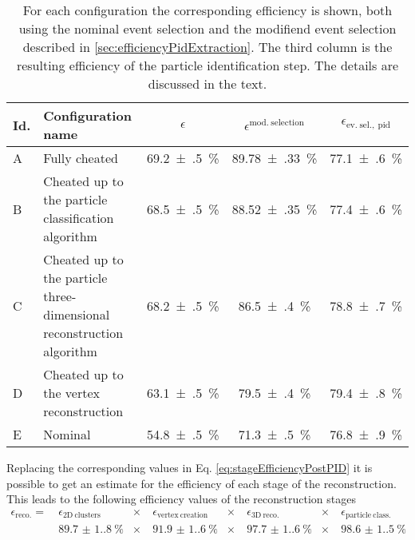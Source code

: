 \begin{table}[]
    \centering
    \caption[Particle identification efficiency for all configurations]{For each configuration the corresponding efficiency is shown, both using the nominal event selection and the modifiend event selection described in \autoref{sec:efficiencyPidExtraction}. The third column is the resulting efficiency of the particle identification step. The details are discussed in the text. }
    \label{tab:pidEfficiencyPerConfiguration}
    \begin{tabular}{lp{4cm}ccc}
        \hline
         Id. & Configuration name & $\epsilon$ & $\epsilon^\mathrm{mod.\ selection}$ & $\epsilon_\mathrm{ev.\ sel.,\ pid}$ \\
         \hline
         A & Fully cheated & \SI{69.2(5)}{\percent} & \SI{89.78(33)}{\percent} & \SI{77.1(6)}{\percent} \\
         B & Cheated up to the particle classification algorithm & \SI{68.5(5)}{\percent} & \SI{88.52(35)}{\percent} & \SI{77.4(6)}{\percent} \\
         C & Cheated up to the particle three-dimensional reconstruction algorithm & \SI{68.2(5)}{\percent} & \SI{86.5(4)}{\percent} & \SI{78.8(7)}{\percent} \\
         D & Cheated up to the vertex reconstruction & \SI{63.1(5)}{\percent} & \SI{79.5(4)}{\percent} & \SI{79.4(8)}{\percent} \\
         E & Nominal & \SI{54.8(5)}{\percent} & \SI{71.3(5)}{\percent} & \SI{76.8(9)}{\percent} \\
         \hline
    \end{tabular}
\end{table}

Replacing the corresponding values in Eq. \eqref{eq:stageEfficiencyPostPID} it is possible to get an estimate for the efficiency of each stage of the reconstruction. This leads to the following efficiency values of the reconstruction stages \begin{equation}
    \begin{aligned}
        \epsilon_\mathrm{reco.} =&\
        \epsilon_\mathrm{2D\ clusters} &\times&\ 
        \epsilon_\mathrm{vertex\ creation} &\times&\ 
        \epsilon_\mathrm{3D\ reco.} &\times&\ 
        \epsilon_\mathrm{particle\ class.} \\  
        &\ \SI{89.7(1.8)}{\percent} &\times&\ 
        \SI{91.9(1.6)}{\percent} &\times&\ 
        \SI{97.7(1.6)}{\percent} &\times&\ 
        \SI{98.6(1.5)}{\percent}
    \end{aligned}
\end{equation}